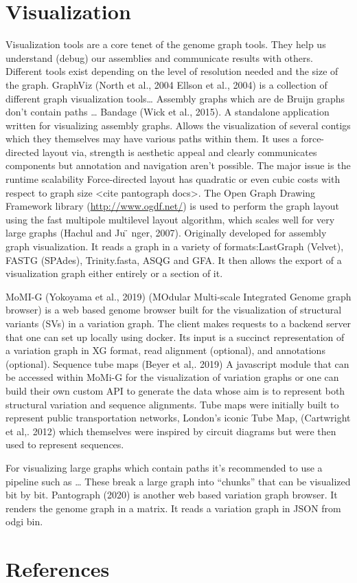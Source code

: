 \documentclass[11pt]{article}
\begin{document}
\section{Visualization}
\label{sec:org91015d1}
Visualization tools are a core tenet of the genome graph tools. They help us understand (debug) our assemblies and communicate results with others. Different tools exist depending on the level of resolution needed and the size of the graph. 
GraphViz (North et al., 2004 Ellson et al., 2004) is a collection of different graph visualization tools\ldots{}
Assembly graphs which are de Bruijn graphs don’t contain paths … Bandage (Wick et al., 2015). A standalone application written for visualizing assembly graphs. Allows the visualization of several contigs which they themselves may have various paths within them. It uses a force-directed layout via, strength is aesthetic appeal and clearly communicates components but annotation and navigation aren’t possible. The major issue is the runtime scalability Force-directed layout has quadratic or even cubic costs with respect to graph size <cite pantograph docs>.
The Open Graph Drawing Framework library (\url{http://www.ogdf.net/}) is used to perform the graph layout using the fast multipole multilevel layout algorithm, which scales well for very large graphs (Hachul and Ju ̈ nger, 2007).
Originally developed for assembly graph visualization.
It reads a graph in a variety of formats:LastGraph (Velvet), FASTG (SPAdes), Trinity.fasta, ASQG and GFA.
It then allows the export of a visualization graph either entirely or a section of it.


MoMI-G (Yokoyama et al., 2019) (MOdular Multi-scale Integrated Genome graph browser) is a web based genome browser built for the visualization of structural variants (SVs) in a variation graph. The client makes requests to a backend server that one can set up locally using docker. Its input is a succinct representation of a variation graph in XG format, read alignment (optional), and annotations (optional). Sequence tube maps (Beyer et al,. 2019) A javascript module that can be accessed within MoMi-G for the visualization of variation graphs or one can build their own custom API to generate the data whose aim is to represent both structural variation and sequence alignments. Tube maps were initially built to represent public transportation networks, London’s iconic Tube Map, (Cartwright et al,. 2012) which themselves were inspired by circuit diagrams but were then used to represent sequences.

For visualizing large graphs which contain paths it’s recommended to use a pipeline such as … These break a large graph into “chunks” that can be visualized bit by bit. 
Pantograph (2020) is another web based variation graph browser. It renders the genome graph in a matrix. It reads a variation graph in JSON from odgi bin.


\section{References}
\label{sec:orgd268761}
\end{document}
